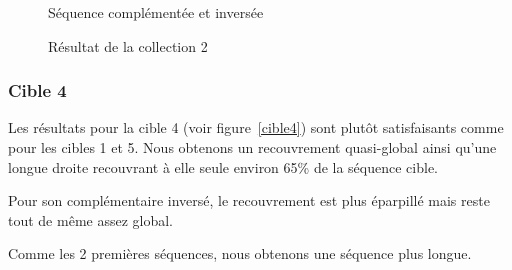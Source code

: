\begin{figure}[!ht]
\begin{minipage}[c]{.46 \linewidth}
\begin{center}
			 Séquence complémentée et inversée
		\end{center}
	\end{minipage}
	\caption{Résultat de la collection 2}
	\label{cible2}
\end{figure}

\FloatBarrier

\subsubsection*{Cible 4}

Les résultats pour la cible 4 (voir figure~\ref{cible4}) sont plutôt satisfaisants comme pour les cibles 1
et 5. Nous obtenons un recouvrement quasi-global ainsi qu'une longue droite
recouvrant à elle seule environ 65\% de la séquence cible.

Pour son complémentaire inversé, le recouvrement est plus éparpillé mais reste
tout de même assez global.

Comme les 2 premières séquences, nous obtenons une séquence plus longue.

